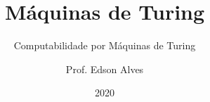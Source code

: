 \title{Máquinas de Turing}
\subtitle{Computabilidade por Máquinas de Turing}
\date{2020}
\author{Prof. Edson Alves}
